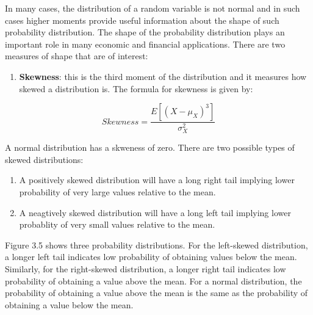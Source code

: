 \documentclass[]{book}
\providecommand{\tightlist}{%
  \setlength{\itemsep}{0pt}\setlength{\parskip}{0pt}}
\theoremstyle{definition}
\theoremstyle{definition}
\theoremstyle{definition}
\theoremstyle{remark}
\begin{document}
In many cases, the distribution of a random variable is not normal and in such cases higher moments provide useful information about the shape of such probability distribution. The shape of the probability distribution plays an important role in many economic and financial applications. There are two measures of shape that are of interest:

\begin{enumerate}
\def\labelenumi{\arabic{enumi}.}
\tightlist
\item
  \textbf{Skewness}: this is the third moment of the distribution and it measures how skewed a distribution is. The formula for skewness is given by:
\end{enumerate}

\[Skewness=\frac{E[(X-\mu_X)^3]}{\sigma^2_X}\]

A normal distribution has a skweness of zero. There are two possible types of skewed distributions:

\begin{enumerate}
\def\labelenumi{\alph{enumi}.}
\item
  A positively skewed distribution will have a long right tail implying lower probability of very large values relative to the mean.
\item
  A neagtively skewed distribution will have a long left tail implying lower probablity of very small values relative to the mean.
\end{enumerate}

Figure 3.5 shows three probability distributions. For the left-skewed distribution, a longer left tail indicates low probability of obtaining values below the mean. Similarly, for the right-skewed distribution, a longer right tail indicates low probability of obtaining a value above the mean. For a normal distribution, the probability of obtaining a value above the mean is the same as the probability of obtaining a value below the mean.
\end{document}
